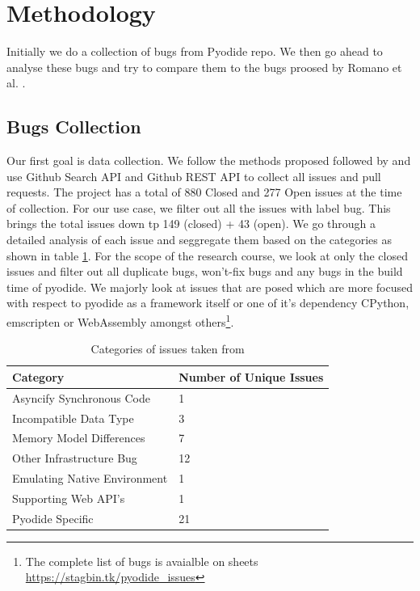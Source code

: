 \section{Methodology}
Initially we do a collection of bugs from Pyodide repo. We then go ahead to analyse these bugs and try to compare them to the bugs proosed by Romano et al. \cite{bugsinwasm}. 

\subsection{Bugs Collection}
Our first goal is data collection. We follow the methods proposed followed by \cite{bugsinwasm} and use Github Search API\cite{githubsearchapi} and Github REST API\cite{githubrestapi} to collect all issues and pull requests. The project has a total of 880 Closed and 277 Open issues at the time of collection. For our use case, we filter out all the issues with label bug. This brings the total issues down tp 149 (closed) + 43 (open). We go through a detailed analysis of each issue and seggregate them based on the categories as shown in table \ref{tab:categories_bugs}. For the scope of the research course, we look at only the closed issues and filter out all duplicate bugs, won't-fix bugs and any bugs in the build time of pyodide. We majorly look at issues that are posed which are more focused with respect to pyodide as a framework itself or one of it's dependency CPython, emscripten or WebAssembly amongst others\footnote{The complete list of bugs is avaialble on sheets \url{https://stagbin.tk/pyodide_issues}}.

\begin{table}[]
    \begin{tabular}{|l|l|}
        \hline
        \textbf{Category}               & \textbf{Number of Unique Issues}  \\ \hline
        Asyncify Synchronous Code       &           1                       \\ \hline
        Incompatible Data Type          &           3                       \\ \hline
        Memory Model Differences        &           7                       \\ \hline
        Other Infrastructure Bug        &           12                      \\ \hline
        Emulating Native Environment    &           1                       \\ \hline
        Supporting Web API's            &           1                       \\ \hline
        Pyodide Specific                &           21                      \\ \hline
    \end{tabular}
\caption{Categories of issues taken from \cite{bugsinwasm}}
\label{tab:categories_bugs}
\end{table}


